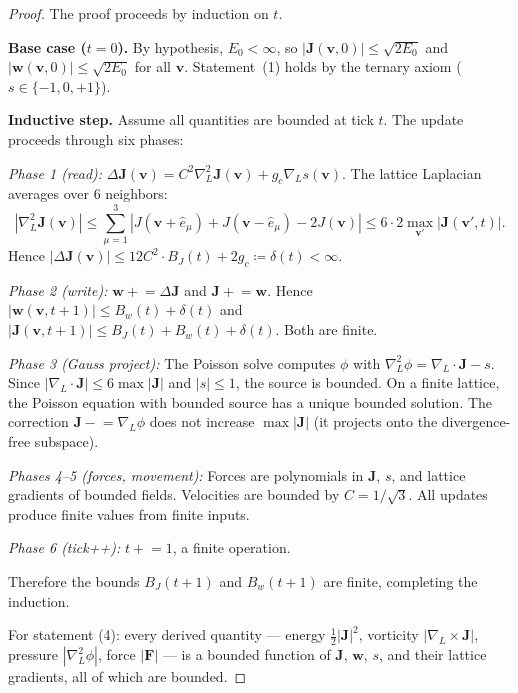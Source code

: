 \documentclass[11pt]{article}
\theoremstyle{tight}
\theoremstyle{plainroman}
\begin{document}
\begin{proof}
The proof proceeds by induction on $t$.

\textbf{Base case ($t=0$).}
By hypothesis, $E_0<\infty$, so $|\mathbf J(\mathbf v,0)|\le\sqrt{2E_0}$ and $|\mathbf w(\mathbf v,0)|\le\sqrt{2E_0}$ for all $\mathbf v$.
Statement~(1) holds by the ternary axiom ($s\in\{-1,0,+1\}$).

\textbf{Inductive step.}
Assume all quantities are bounded at tick $t$.
The update proceeds through six phases:

\emph{Phase 1 (read):}
$\Delta\mathbf J(\mathbf v)=C^2\nabla_L^2\mathbf J(\mathbf v)+g_c\nabla_L s(\mathbf v)$.
The lattice Laplacian averages over 6 neighbors:
\[
|\nabla_L^2\mathbf J(\mathbf v)|\le\sum_{\mu=1}^{3}|J(\mathbf v+\hat e_\mu)+J(\mathbf v-\hat e_\mu)-2J(\mathbf v)|\le 6\cdot 2\max_{\mathbf v'}|\mathbf J(\mathbf v',t)|.
\]
Hence $|\Delta\mathbf J(\mathbf v)|\le 12C^2\cdot B_J(t)+2g_c\coloneqq\delta(t)<\infty$.

\emph{Phase 2 (write):}
$\mathbf w\mathrel{+}=\Delta\mathbf J$ and $\mathbf J\mathrel{+}=\mathbf w$.
Hence $|\mathbf w(\mathbf v,t+1)|\le B_w(t)+\delta(t)$ and $|\mathbf J(\mathbf v,t+1)|\le B_J(t)+B_w(t)+\delta(t)$.
Both are finite.

\emph{Phase 3 (Gauss project):}
The Poisson solve computes $\phi$ with $\nabla_L^2\phi=\nabla_L\!\cdot\!\mathbf J-s$.
Since $|\nabla_L\!\cdot\!\mathbf J|\le 6\max|\mathbf J|$ and $|s|\le 1$, the source is bounded.
On a finite lattice, the Poisson equation with bounded source has a unique bounded solution.
The correction $\mathbf J\mathrel{-}=\nabla_L\phi$ does not increase $\max|\mathbf J|$ (it projects onto the divergence-free subspace).

\emph{Phases 4--5 (forces, movement):}
Forces are polynomials in $\mathbf J$, $s$, and lattice gradients of bounded fields.
Velocities are bounded by $C=1/\sqrt{3}$.
All updates produce finite values from finite inputs.

\emph{Phase 6 (tick++):}
$t\mathrel{+}=1$, a finite operation.

Therefore the bounds $B_J(t+1)$ and $B_w(t+1)$ are finite, completing the induction.

For statement (4): every derived quantity --- energy $\frac{1}{2}|\mathbf J|^2$, vorticity $|\nabla_L\times\mathbf J|$, pressure $|\nabla_L^2\phi|$, force $|\mathbf F|$ --- is a bounded function of $\mathbf J$, $\mathbf w$, $s$, and their lattice gradients, all of which are bounded.
\end{proof}
\end{document}
